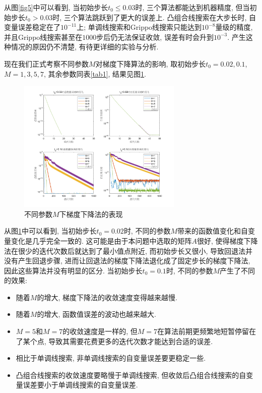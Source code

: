 \documentclass[UTF8]{ctexart}
\begin{document}
从图\ref{fig5}中可以看到, 当初始步长$t_0\leq 0.03$时, 三个算法都能达到机器精度, 但当初始步长$t_0>0.03$时, 三个算法跳跃到了更大的误差上. 凸组合线搜索在大步长时, 自变量误差稳定在了$10^{-11}$上; 单调线搜索和Grippo线搜索只能达到$10^{-8}$量级的精度, 并且Grippo线搜索甚至在$1000$步后仍无法保证收敛, 误差有时会升到$10^{-3}$. 产生这种情况的原因仍不清楚, 有待更详细的实验与分析. 

现在我们正式考察不同参数$M$对梯度下降算法的影响, 取初始步长$t_0=0.02,0.1$, $M=1,3,5,7$, 其余参数同表\ref{tab1}, 结果见图\ref{fig6}. 

\begin{figure}[htb]
    \centering
    \includegraphics[width=0.7\textwidth]{Q2-figure/6.png}
    \caption{不同参数$M$下梯度下降法的表现}\label{fig6}
\end{figure}

从图\ref{fig6}中可以看到, 当初始步长$t_0=0.02$时, 不同的参数$M$带来的函数值变化和自变量变化是几乎完全一致的. 这可能是由于本问题中选取的矩阵$A$很好, 使得梯度下降法在很少的迭代次数后就达到了最小值点附近, 而初始步长又很小, 导致回退法并没有产生回退步骤, 进而让回退法的梯度下降法退化成了固定步长的梯度下降法, 因此这些算法并没有明显的区分. 当初始步长$t_0=0.1$时, 不同的参数$M$产生了不同的效果: 
\begin{itemize}
    \item 随着$M$的增大, 梯度下降法的收敛速度变得越来越慢.
    \item 随着$M$的增大, 函数值误差的波动也越来越大.
    \item $M=5$和$M=7$的收敛速度是一样的, 但$M=7$在算法前期更频繁地短暂停留在了某个点, 导致其需要花费更多的迭代次数才能达到合适的误差. 
    \item 相比于单调线搜索, 非单调线搜索的自变量误差要更稳定一些. 
    \item 凸组合线搜索的收敛速度要略慢于单调线搜索, 但收敛后凸组合线搜索的自变量误差要小于单调线搜索的自变量误差. 
\end{itemize}
\end{document}
